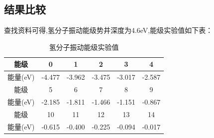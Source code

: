 \documentclass[11pt, a4paper, oneside]{ctexart}
\begin{document}
{{{{\begin{flushright}
        \end{flushright}
        



}
\subsection{结果比较}

{
    查找资料可得,氢分子振动能级势井深度为4.6eV,能级实验值如下表：


    {

    \begin{table}[h]
    \centering
    \caption{氢分子振动能级实验值}
    \begin{tabular}{@{}cccccc@{}}
    \toprule
    
    能级 & 0      & 1      & 2      & 3      & 4      \\ \midrule
    能量(eV) & -4.477 & -3.962 & -3.475 & -3.017 & -2.587 \\\cmidrule[1pt](){1-6}
    能级 & 5      & 6      & 7      & 8      & 9      \\\cmidrule(){1-6}
    能量(eV) & -2.185 & -1.811 & -1.466 & -1.151 & -0.867 \\\cmidrule[1pt](){1-6}
    能级 & 10     & 11     & 12     & 13     & 14     \\\cmidrule(){1-6}
    能量(eV) & -0.615 & -0.400 & -0.225 & -0.094 & -0.017 \\ \bottomrule
    \end{tabular}
    \end{table}
    }

}}}}
\end{document}

